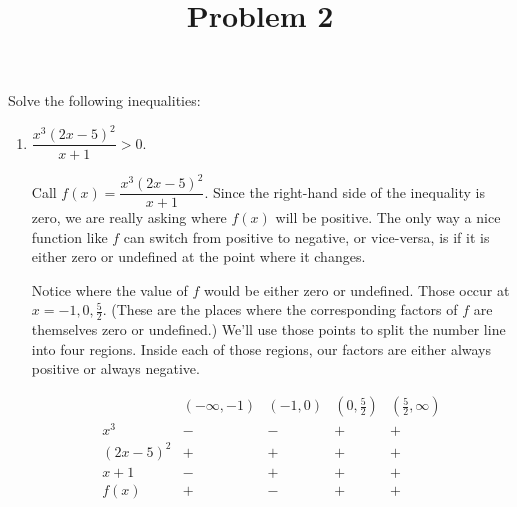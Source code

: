\documentclass{ximera}
\title[Problem 2]{Problem 2}
\begin{document}
\begin{abstract} \end{abstract}
\maketitle


\begin{problem}
	Solve the following inequalities:
	\begin{enumerate}


		\item $\displaystyle  \dfrac{x^3 \left(2x-5\right)^2}{x+1} > 0$.
\begin{explanation}
				Call $f(x) = \dfrac{x^3 \left(2x-5\right)^2}{x+1}$.
				Since the right-hand side of the inequality is zero, we are really asking where $f(x)$ will be positive.  The only way
				a nice function like $f$ can switch from positive to negative, or vice-versa, is if it is either zero
				or undefined at the point where it changes.
		
				Notice where the value of $f$ would be either zero or undefined.  Those occur at $x = -1, 0, \frac{5}{2}$. (These are the places
				where the corresponding factors of $f$ are themselves zero or undefined.)  
				We'll use those points to split the number line into four regions. Inside each of those regions, our factors are either
				always positive or always negative.
				



\[
\begin{array}{c|cccc}
\text{} & (-\infty,-1) & (-1,0) & \left(0,\frac{5}{2}\right) & \left(\frac{5}{2},\infty\right)\\\hline
x^3 & - & - & + & +\\
(2x-5)^2 & + & + & + & +\\
x+1 & - & + & + & +\\
f(x) & + & - & + & +\\
\end{array}
\]
				

\end{explanation}
\end{enumerate}
\end{problem}
\end{document}
